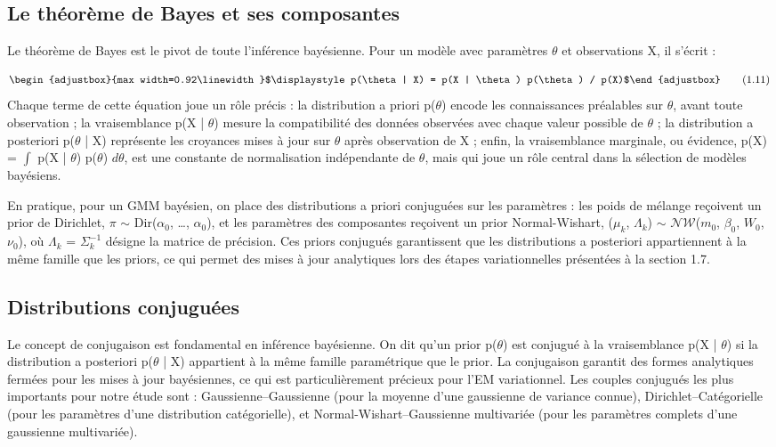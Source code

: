 \subsection{Le théorème de Bayes et ses composantes}
Le théorème de Bayes est le pivot de toute l'inférence bayésienne. Pour un modèle avec paramètres $\theta $ et observations X, il s'écrit :

\begin{equation}
\begin{adjustbox}{max width=0.92\linewidth}$\displaystyle p(\theta  | X) = p(X | \theta ) p(\theta ) / p(X)$\end{adjustbox}
\tag{1.11}
\label{eq:1_11}
\end{equation}
Chaque terme de cette équation joue un rôle précis : la distribution a priori p($\theta $) encode les connaissances préalables sur $\theta $, avant toute observation ; la vraisemblance p(X | $\theta $) mesure la compatibilité des données observées avec chaque valeur possible de $\theta $ ; la distribution a posteriori p($\theta $ | X) représente les croyances mises à jour sur $\theta $ après observation de X ; enfin, la vraisemblance marginale, ou évidence, p(X) = $\int $ p(X | $\theta $) p($\theta $) $d\theta $, est une constante de normalisation indépendante de $\theta $, mais qui joue un rôle central dans la sélection de modèles bayésiens.

En pratique, pour un GMM bayésien, on place des distributions a priori conjuguées sur les paramètres : les poids de mélange reçoivent un prior de Dirichlet, $\pi $ $\sim $ Dir($\alpha _{0}$, \ldots{}, $\alpha _{0}$), et les paramètres des composantes reçoivent un prior Normal-Wishart, ($\mu _{k}$, $\Lambda _{k}$) $\sim $ $\mathcal{N}\mathcal{W}$($m_{0}$, $\beta _{0}$, $W_{0}$, $\nu _{0}$), où $\Lambda _{k}$ = $\Sigma _{k}^{-1}$ désigne la matrice de précision. Ces priors conjugués garantissent que les distributions a posteriori appartiennent à la même famille que les priors, ce qui permet des mises à jour analytiques lors des étapes variationnelles présentées à la section 1.7.

\subsection{Distributions conjuguées}
Le concept de conjugaison est fondamental en inférence bayésienne. On dit qu'un prior p($\theta $) est conjugué à la vraisemblance p(X | $\theta $) si la distribution a posteriori p($\theta $ | X) appartient à la même famille paramétrique que le prior. La conjugaison garantit des formes analytiques fermées pour les mises à jour bayésiennes, ce qui est particulièrement précieux pour l'EM variationnel. Les couples conjugués les plus importants pour notre étude sont : Gaussienne--Gaussienne (pour la moyenne d'une gaussienne de variance connue), Dirichlet--Catégorielle (pour les paramètres d'une distribution catégorielle), et Normal-Wishart--Gaussienne multivariée (pour les paramètres complets d'une gaussienne multivariée).

